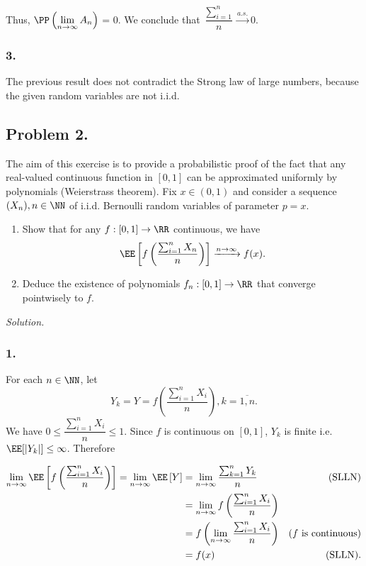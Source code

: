 Thus, $\PP\left(\lim\limits_{n\to\infty} A_n\right)$ = 0. We conclude that $\dfrac{\sum\limits_{i=1}^n}{n}\xrightarrow{a.s.} 0$.

\subsubsection*{3.} The previous result does not contradict the Strong law of large numbers, because the given random variables are not i.i.d.

\subsection*{Problem 2.} The aim of this exercise is to provide a probabilistic proof of the fact that any
real-valued continuous function in $[0, 1]$ can be approximated uniformly by polynomials (Weierstrass theorem). Fix $x \in (0, 1)$ and consider a sequence $(X_n), n\in\NN$ of i.i.d. Bernoulli random variables of parameter $p = x$.

\begin{enumerate}
    \item Show that for any $f:[0,1]\to\RR$ continuous, we have
    $$\EE\left[f\left(\dfrac{\sum_{i=1}^nX_n}{n}\right)\right]\xrightarrow{n\to\infty}f(x).$$
    \item Deduce the existence of polynomials $f_n :[0, 1]\to\RR$ that converge pointwisely to $f$.
\end{enumerate}

\textit{Solution.}

\subsubsection*{1.} For each $n\in\NN$, let $$Y_k = Y = f\left(\dfrac{\sum_{i=1}^n X_i}{n}\right), k = \overline{1,n}.$$
We have $0\le \dfrac{\sum_{i=1}^n X_i}{n}\le 1$. Since $f$ is continuous on $[0,1]$, $Y_k$ is finite i.e. $\EE[|Y_k|] \le \infty$. Therefore

\begin{align*}
\lim\limits_{n\to\infty} \EE\left[f\left(\dfrac{\sum_{i=1}^nX_i}{n}\right)\right] =  \lim\limits_{n\to\infty} \EE\left[Y\right] 
&= \lim\limits_{n\to\infty} \dfrac{\sum_{k=1}^n Y_k}{n}  & \text{(SLLN)}\\
&= \lim\limits_{n\to\infty} f\left(\dfrac{\sum_{i=1}^n X_i}{n}\right) \\
&= f\left(\lim\limits_{n\to\infty}\dfrac{\sum_{i=1}^n X_i}{n}\right) & \text{($f$ is continuous)}\\
&= f(x) & \text{(SLLN)}.
\end{align*}

